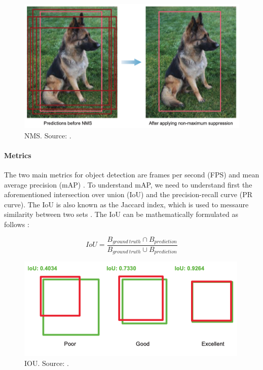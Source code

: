 \documentclass[a4paper,11pt,oneside]{article}
\begin{document}
  \begin{figure}[ht]
    \begin{center}
      \includegraphics[width=.8\textwidth]{nms.png}
    \end{center}
    \caption{NMS. Source: \cite{elgendy2020deep}.}
  \end{figure}

  \paragraph{Metrics}

  The two main metrics for object detection are frames per second (FPS) and mean average precision (mAP)
  \cite{elgendy2020deep, liu2020deep, geron2019hands, planche2019hands}. To understand mAP, we need to understand first
  the aforementioned intersection over union (IoU) and the precision-recall curve (PR curve). The IoU is also known as
  the Jaccard index, which is used to messaure similarity between two sets \cite{planche2019hands}. The IoU can be
  mathematically formulated as follows \cite{elgendy2020deep, planche2019hands}:

  $$IoU = \frac{B_{ground \ truth} \cap B_{prediction}}{B_{ground \ truth} \cup B_{prediction}}$$

  \begin{figure}[ht]
    \begin{center}
      \includegraphics[width=.8\textwidth]{iou.png}
    \end{center}
    \caption{IOU. Source: \cite{elgendy2020deep}.}
  \end{figure}
\end{document}
